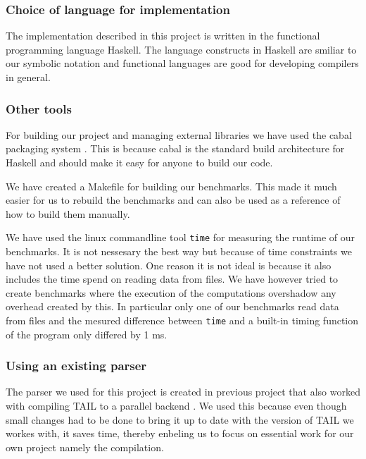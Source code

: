 \documentclass[11pt]{article}
\begin{document}
\subsubsection{Choice of language for implementation}
The implementation described in this project is written in the functional programming language Haskell.
The language constructs in Haskell are smiliar to our symbolic notation and functional languages are good for developing compilers in general.\cite{TorbenMogensen}

\subsubsection{Other tools}
For building our project and managing external libraries we have used the cabal packaging system \cite{cabal}.
This is because cabal is the standard build architecture for Haskell and should make it easy for anyone to build our code.

We have created a Makefile for building our benchmarks. This made it much easier for us to rebuild the benchmarks and can also be used
as a reference of how to build them manually.

We have used the linux commandline tool {\tt time} for measuring the runtime of our benchmarks. 
It is not nessesary the best way but because of time constraints we have not used a better solution. 
One reason it is not ideal is because it also includes the time spend on reading data from files. We have however tried to create benchmarks where the execution of the computations overshadow any overhead created by this. In particular only one of our benchmarks read
data from files and the mesured difference between {\tt time} and a built-in timing function of the program only differed by 1 ms.

\subsubsection{Using an existing parser}
The parser we used for this project is created in previous project that also worked with compiling TAIL to a parallel backend \cite{APLACC}. We used this because even though small changes had to be done to bring it up to date with the version of TAIL we workes with, it saves time, thereby enbeling us to focus on essential work for our own project namely the compilation.
\end{document}
